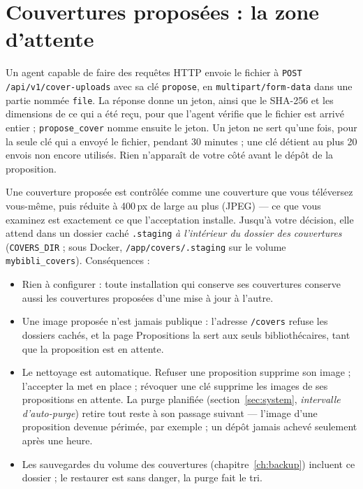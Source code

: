 \section{Couvertures proposées : la zone d'attente}
\label{sec:agents-staging}

Un agent capable de faire des requêtes HTTP envoie le fichier à
\texttt{POST /api/v1/cover-uploads} avec sa clé \texttt{propose}, en
\texttt{multipart/form-data} dans une partie nommée \texttt{file}. La
réponse donne un jeton, ainsi que le SHA-256 et les dimensions de ce qui
a été reçu, pour que l'agent vérifie que le fichier est arrivé entier ;
\texttt{propose\_cover} nomme ensuite le jeton. Un jeton ne sert qu'une
fois, pour la seule clé qui a envoyé le fichier, pendant 30 minutes ; une
clé détient au plus 20 envois non encore utilisés. Rien n'apparaît de
votre côté avant le dépôt de la proposition.

Une couverture proposée est contrôlée comme une couverture que vous
téléversez vous-même, puis réduite à 400\,px de large au plus
(JPEG) --- ce que vous examinez est exactement ce que l'acceptation
installe. Jusqu'à votre décision, elle attend dans un dossier caché
\texttt{.staging} \emph{à l'intérieur du
dossier des couvertures} (\texttt{COVERS\_DIR} ; sous Docker,
\texttt{/app/covers/.staging} sur le volume
\texttt{mybibli\_covers}). Conséquences :

\begin{itemize}
  \item Rien à configurer : toute installation qui conserve ses
        couvertures conserve aussi les couvertures proposées d'une
        mise à jour à l'autre.
  \item Une image proposée n'est jamais publique : l'adresse
        \texttt{/covers} refuse les dossiers cachés, et la page
        Propositions la sert aux seuls bibliothécaires, tant que la
        proposition est en attente.
  \item Le nettoyage est automatique. Refuser une proposition supprime
        son image ; l'accepter la met en place ; révoquer une clé
        supprime les images de ses propositions en attente. La purge
        planifiée (section~\ref{sec:system}, \emph{intervalle d'auto-purge}) retire tout reste à son passage
        suivant --- l'image d'une proposition devenue périmée, par
        exemple ; un dépôt jamais achevé seulement après une heure.
  \item Les sauvegardes du volume des couvertures
        (chapitre~\ref{ch:backup}) incluent ce dossier ; le restaurer
        est sans danger, la purge fait le tri.
\end{itemize}

